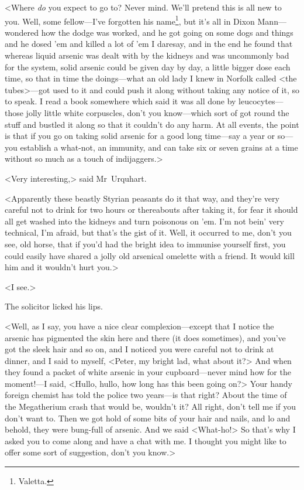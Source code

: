 <Where \emph{do} you expect to go to? Never mind. We'll pretend this is all new to you. Well, some fellow—I've forgotten his name\footnote{Valetta.}, but it's all in Dixon Mann—wondered how the dodge was worked, and he got going on some dogs and things and he dosed 'em and killed a lot of 'em I daresay, and in the end he found that whereas liquid arsenic was dealt with by the kidneys and was uncommonly bad for the system, solid arsenic could be given day by day, a little bigger dose each time, so that in time the doings—what an old lady I knew in Norfolk called <the tubes>—got used to it and could push it along without taking any notice of it, so to speak. I read a book somewhere which said it was all done by leucocytes—those jolly little white corpuscles, don't you know—which sort of got round the stuff and bustled it along so that it couldn't do any harm. At all events, the point is that if you go on taking solid arsenic for a good long time—say a year or so—you establish a what-not, an immunity, and can take six or seven grains at a time without so much as a touch of indijaggers.>

<Very interesting,> said Mr~Urquhart.

<Apparently these beastly Styrian peasants do it that way, and they're very careful not to drink for two hours or thereabouts after taking it, for fear it should all get washed into the kidneys and turn poisonous on 'em. I'm not bein' very technical, I'm afraid, but that's the gist of it. Well, it occurred to me, don't you see, old horse, that if you'd had the bright idea to immunise yourself first, you could easily have shared a jolly old arsenical omelette with a friend. It would kill him and it wouldn't hurt you.>

<I see.>

The solicitor licked his lips.

<Well, as I say, you have a nice clear complexion—except that I notice the arsenic has pigmented the skin here and there (it does sometimes), and you've got the sleek hair and so on, and I noticed you were careful not to drink at dinner, and I said to myself, <Peter, my bright lad, what about it?> And when they found a packet of white arsenic in your cupboard—never mind how for the moment!—I said, <Hullo, hullo, how long has this been going on?> Your handy foreign chemist has told the police two years—is that right? About the time of the Megatherium crash that would be, wouldn't it? All right, don't tell me if you don't want to. Then we got hold of some bits of your hair and nails, and lo and behold, they were bung-full of arsenic. And we said <What-ho!> So that's why I asked you to come along and have a chat with me. I thought you might like to offer some sort of suggestion, don't you know.>

